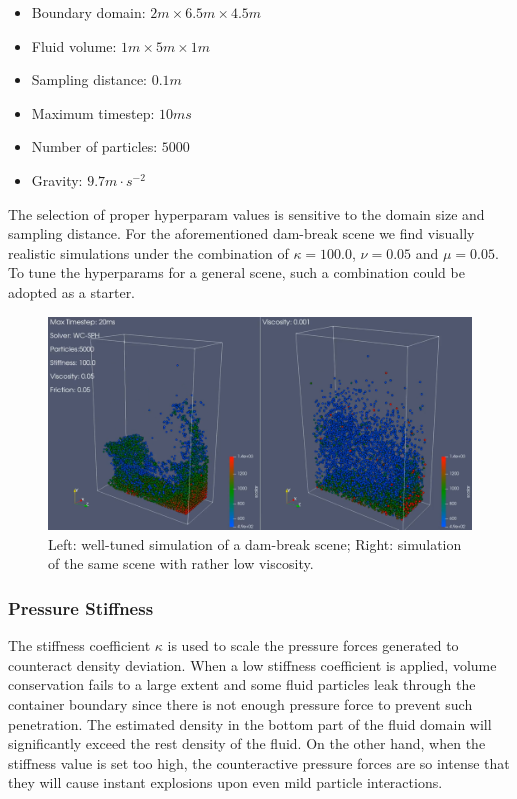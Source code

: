\documentclass[
	11pt, 
	DIV10,
	ngerman,
	a4paper, 
	oneside, 
	headings=normal, 
	captions=tableheading,
	final, 
	numbers=noenddot
]{scrartcl}
\begin{document}
\begin{itemize}
    \item Boundary domain: $ 2m \times 6.5m \times 4.5m $
    \item Fluid volume: $ 1m \times 5m \times 1m $
    \item Sampling distance: $ 0.1m $
    \item Maximum timestep: $ 10ms $
    \item Number of particles: $ 5000 $
    \item Gravity: $ 9.7m \cdot s^{-2} $
\end{itemize}

The selection of proper hyperparam values is sensitive to the domain size and sampling distance. For the aforementioned dam-break scene we find visually realistic simulations under the combination of $ \kappa = 100.0 $, $ \nu = 0.05 $ and $ \mu = 0.05 $. To tune the hyperparams for a general scene, such a combination could be adopted as a starter.

\begin{figure}
    \centering
    \includegraphics[width=.6\textwidth]{pics/wcsph_viscosity.png}
    \caption{Left: well-tuned simulation of a dam-break scene; Right: simulation of the same scene with rather low viscosity.}
    \label{fig:visco}
\end{figure}

\subsubsection{Pressure Stiffness}

The stiffness coefficient $ \kappa $ is used to scale the pressure forces generated to counteract density deviation. When a low stiffness coefficient is applied, volume conservation fails to a large extent and some fluid particles leak through the container boundary since there is not enough pressure force to prevent such penetration. The estimated density in the bottom part of the fluid domain will significantly exceed the rest density of the fluid. On the other hand, when the stiffness value is set too high, the counteractive pressure forces are so intense that they will cause instant explosions upon even mild particle interactions.
\end{document}
